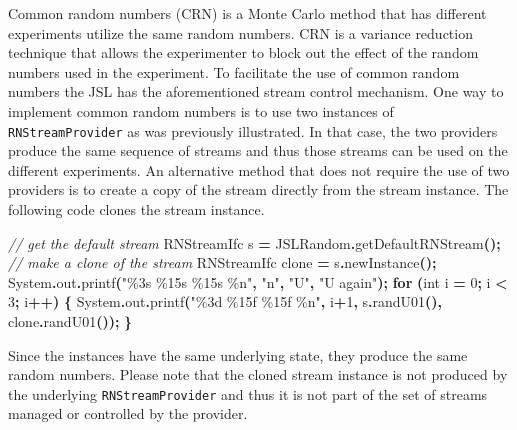 \documentclass[
]{book}
\newenvironment{Shaded}{\begin{snugshade}}{\end{snugshade}}
\newcommand{\BuiltInTok}[1]{#1}
\newcommand{\CommentTok}[1]{\textcolor[rgb]{0.56,0.35,0.01}{\textit{#1}}}
\newcommand{\ControlFlowTok}[1]{\textcolor[rgb]{0.13,0.29,0.53}{\textbf{#1}}}
\newcommand{\DataTypeTok}[1]{\textcolor[rgb]{0.13,0.29,0.53}{#1}}
\newcommand{\DecValTok}[1]{\textcolor[rgb]{0.00,0.00,0.81}{#1}}
\newcommand{\FunctionTok}[1]{\textcolor[rgb]{0.00,0.00,0.00}{#1}}
\newcommand{\NormalTok}[1]{#1}
\newcommand{\OperatorTok}[1]{\textcolor[rgb]{0.81,0.36,0.00}{\textbf{#1}}}
\newcommand{\SpecialCharTok}[1]{\textcolor[rgb]{0.00,0.00,0.00}{#1}}
\newcommand{\StringTok}[1]{\textcolor[rgb]{0.31,0.60,0.02}{#1}}
\theoremstyle{definition}
\theoremstyle{definition}
\theoremstyle{definition}
\theoremstyle{definition}
\theoremstyle{remark}
\begin{document}
Common random numbers (CRN) is a Monte Carlo method that has different experiments utilize the same random numbers. CRN is a variance reduction technique that allows the experimenter to block out the effect of the random numbers used in the experiment. To facilitate the use of common random numbers the JSL has the aforementioned stream control mechanism. One way to implement common random numbers is to use two instances of \texttt{RNStreamProvider} as was previously illustrated. In that case, the two providers produce the same sequence of streams and thus those streams can be used on the different experiments. An alternative method that does not require the use of two providers is to create a copy of the stream directly from the stream instance. The following code clones the stream instance.

\begin{Shaded}
\begin{Highlighting}[]
\CommentTok{// get the default stream}
\NormalTok{RNStreamIfc s }\OperatorTok{=}\NormalTok{ JSLRandom}\OperatorTok{.}\FunctionTok{getDefaultRNStream}\OperatorTok{();}
\CommentTok{// make a clone of the stream}
\NormalTok{RNStreamIfc clone }\OperatorTok{=}\NormalTok{ s}\OperatorTok{.}\FunctionTok{newInstance}\OperatorTok{();}
\BuiltInTok{System}\OperatorTok{.}\FunctionTok{out}\OperatorTok{.}\FunctionTok{printf}\OperatorTok{(}\StringTok{"}\SpecialCharTok{\%3s}\StringTok{ }\SpecialCharTok{\%15s}\StringTok{ }\SpecialCharTok{\%15s}\StringTok{ }\SpecialCharTok{\%n}\StringTok{"}\OperatorTok{,} \StringTok{"n"}\OperatorTok{,} \StringTok{"U"}\OperatorTok{,} \StringTok{"U again"}\OperatorTok{);}
\ControlFlowTok{for} \OperatorTok{(}\DataTypeTok{int}\NormalTok{ i }\OperatorTok{=} \DecValTok{0}\OperatorTok{;}\NormalTok{ i }\OperatorTok{\textless{}} \DecValTok{3}\OperatorTok{;}\NormalTok{ i}\OperatorTok{++)} \OperatorTok{\{}
    \BuiltInTok{System}\OperatorTok{.}\FunctionTok{out}\OperatorTok{.}\FunctionTok{printf}\OperatorTok{(}\StringTok{"}\SpecialCharTok{\%3d}\StringTok{ }\SpecialCharTok{\%15f}\StringTok{ }\SpecialCharTok{\%15f}\StringTok{ }\SpecialCharTok{\%n}\StringTok{"}\OperatorTok{,}\NormalTok{ i}\OperatorTok{+}\DecValTok{1}\OperatorTok{,}\NormalTok{ s}\OperatorTok{.}\FunctionTok{randU01}\OperatorTok{(),}\NormalTok{ clone}\OperatorTok{.}\FunctionTok{randU01}\OperatorTok{());}
\OperatorTok{\}}
\end{Highlighting}
\end{Shaded}

Since the instances have the same underlying state, they produce the same random numbers. Please note that the cloned stream instance is not produced by the underlying \texttt{RNStreamProvider} and thus it is not part of the set of streams managed or controlled by the provider.
\end{document}
